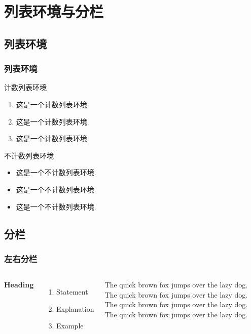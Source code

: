 \documentclass[notheorems]{beamer}
\theoremstyle{plain}
\numberwithin{theorem}{section}
\numberwithin{definition}{section}
\numberwithin{lemma}{section}
\numberwithin{proposition}{section}
\numberwithin{corollary}{section}
\theoremstyle{example}
\numberwithin{figure}{section}
\numberwithin{table}{section}
\numberwithin{equation}{section}
\begin{document}
\section{列表环境与分栏}
\subsection{列表环境}

\begin{frame}
\frametitle{列表环境}

计数列表环境
\begin{enumerate}
\item 这是一个计数列表环境.
\item 这是一个计数列表环境.
\item 这是一个计数列表环境.
\end{enumerate}

\vspace{2ex}
不计数列表环境
\begin{itemize}[<+-| alert@+>]
\item 这是一个不计数列表环境.
\item 这是一个不计数列表环境.
\item 这是一个不计数列表环境.
\end{itemize}

\end{frame}

\subsection{分栏}

\begin{frame}
\frametitle{左右分栏}  %
\begin{columns}[t] %

\textbf{Heading}
\begin{enumerate}
\item Statement
\item Explanation
\item Example
\end{enumerate}

The quick brown fox jumps over the lazy dog. The quick brown fox jumps over the lazy dog. The quick brown fox jumps over the lazy dog. The quick brown fox jumps over the lazy dog.
\end{columns}
\end{frame}
\end{document}

